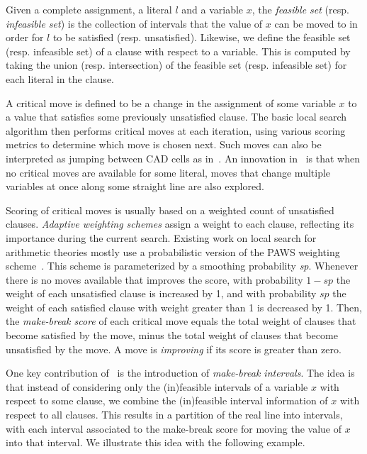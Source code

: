 \documentclass[runningheads]{llncs}
\begin{document}
\begin{definition}
Given a complete assignment, a literal $l$ and a variable $x$, the \emph{feasible set} (resp. \emph{infeasible set}) is the collection of intervals that the value of $x$ can be moved to in order for $l$ to be satisfied (resp. unsatisfied). Likewise, we define the feasible set (resp. infeasible set) of a clause with respect to a variable. This is computed by taking the union (resp. intersection) of the feasible set (resp. infeasible set) for each literal in the clause.
\end{definition}

A critical move is defined to be a change in the assignment of some variable $x$ to a value that satisfies some previously unsatisfied clause. The basic local search algorithm then performs critical moves at each iteration, using various scoring metrics to determine which move is chosen next. Such moves can also be interpreted as jumping between CAD cells as in~\cite{LiXZ23}. An innovation in~\cite{LiXZ23} is that when no critical moves are available for some literal, moves that change multiple variables at once along some straight line are also explored.

Scoring of critical moves is usually based on a weighted count of unsatisfied clauses. \emph{Adaptive weighting schemes} assign a weight to each clause, reflecting its importance during the current search. Existing work on local search for arithmetic theories mostly use a probabilistic version of the PAWS weighting scheme~\cite{ThorntonPBF04}. This scheme is parameterized by a smoothing probability \textit{sp}. Whenever there is no moves available that improves the score, with probability $1-\mathit{sp}$ the weight of each unsatisfied clause is increased by 1, and with probability $\mathit{sp}$ the weight of each satisfied clause with weight greater than 1 is decreased by 1. Then, the \emph{make-break score} of each critical move equals the total weight of clauses that become satisfied by the move, minus the total weight of clauses that become unsatisfied by the move. A move is \emph{improving} if its score is greater than zero.

One key contribution of~\cite{abs-2303-06676} is the introduction of \emph{make-break intervals}. The idea is that instead of considering only the (in)feasible intervals of a variable $x$ with respect to some clause, we combine the (in)feasible interval information of $x$ with respect to all clauses. This results in a partition of the real line into intervals, with each interval associated to the make-break score for moving the value of $x$ into that interval. We illustrate this idea with the following example.
\end{document}
